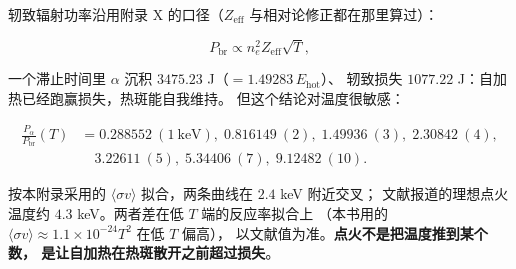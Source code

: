 轫致辐射功率沿用附录 X 的口径（$Z_{\mathrm{eff}}$ 与相对论修正都在那里算过）：

\begin{equation}
P_{\mathrm{br}} \propto n_e^2 Z_{\mathrm{eff}} \sqrt{T},
\label{eq:app-ai-brems}
\end{equation}

一个滞止时间里 $\alpha$ 沉积 $3475.23$ J（$=1.49283\,E_{\mathrm{hot}}$）、
轫致损失 $1077.22$ J：自加热已经跑赢损失，热斑能自我维持。
但这个结论对温度很敏感：

\begin{equation}
\begin{aligned}
\frac{P_\alpha}{P_{\mathrm{br}}}(T) &= 0.288552\ (1\ \mathrm{keV}),\;
0.816149\ (2),\; 1.49936\ (3),\; 2.30842\ (4),\\
&\quad 3.22611\ (5),\; 5.34406\ (7),\; 9.12482\ (10).
\end{aligned}
\label{eq:app-ai-range}
\end{equation}

按本附录采用的 $\langle\sigma v\rangle$ 拟合，两条曲线在 $2.4$ keV 附近交叉；
文献报道的理想点火温度约 $4.3$ keV。两者差在低 $T$ 端的反应率拟合上
（本书用的 $\langle\sigma v\rangle \approx 1.1\times10^{-24}T^2$ 在低 $T$ 偏高），
以文献值为准。\textbf{点火不是把温度推到某个数，
是让自加热在热斑散开之前超过损失}。

